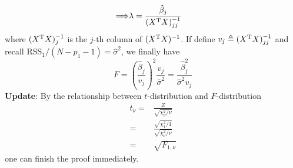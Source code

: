 \begin{sol}
\begin{align*}
\Longrightarrow & \lambda = \frac{\hat{\beta}_j}{(X^{\mathrm{T}}X)^{-1}_{jj}}
\end{align*}
where $(X^{\mathrm{T}}X)^{-1}_j$ is the $j$-th column of $(X^{\mathrm{T}}X)^{-1}$. If define $v_j\triangleq(X^{\mathrm{T}}X)^{-1}_{jj}$ and recall $\mathrm{RSS}_1/(N-p_1-1)=\hat{\sigma}^2$, we finally have
\[
F = \left(\frac{\hat{\beta}_j}{v_j}\right)^2 \frac{v_j}{\hat{\sigma}^2} = \frac{\hat{\beta}_j^2}{\hat{\sigma}^2v_j}
\]
\textbf{Update}: By the relationship between $t$-distribution and $F$-distribution
\begin{align*}
t_\nu=& \frac{Z}{\sqrt{\chi_\nu^2/\nu}}\\
=& \frac{\sqrt{\chi_1^2/1}}{\sqrt{\chi_\nu^2/\nu}}\\
=& \sqrt{F_{1,\nu}}
\end{align*}
one can finish the proof immediately.
\end{sol}


